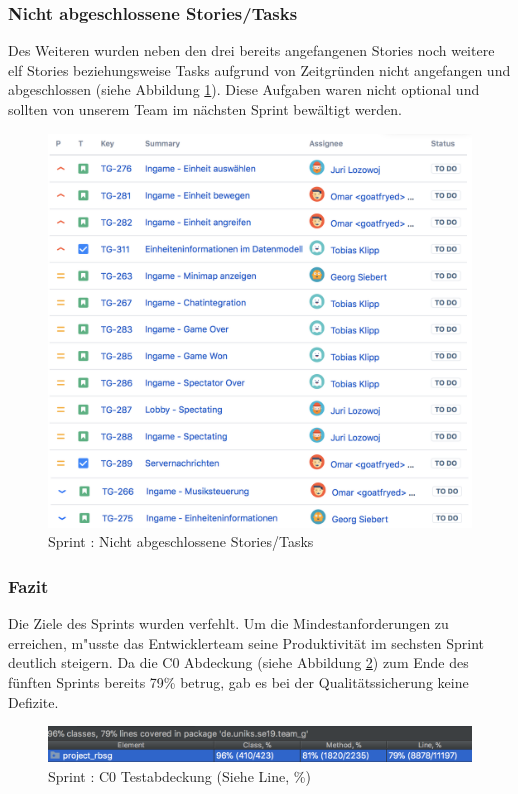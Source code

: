 \documentclass[12pt, titlepage]{scrartcl}
\newcommand{\RN}[1]{%
	\textup{\uppercase\expandafter{\romannumeral#1}}%
}
\begin{document}
        	\subsubsection{Nicht abgeschlossene Stories/Tasks}
        		Des Weiteren wurden neben den drei bereits angefangenen Stories noch weitere elf Stories beziehungsweise Tasks aufgrund von Zeitgr\"unden nicht angefangen und abgeschlossen (siehe Abbildung \ref{To_Do_5}). Diese Aufgaben waren nicht optional und sollten von unserem Team im n\"achsten Sprint bew\"altigt werden.
        		\begin{figure}[H] 
        			\centering
        			\includegraphics[width=\textwidth]{images/sprintV/openIssues.png}
        			\caption{Sprint \RN{5}: Nicht abgeschlossene Stories/Tasks}
        			\label{To_Do_5}
        		\end{figure}
        	\subsubsection{Fazit}
        		Die Ziele des Sprints wurden verfehlt. Um die Mindestanforderungen zu erreichen, m"usste das Entwicklerteam seine Produktivit\"at im sechsten Sprint deutlich steigern. Da die C0 Abdeckung (siehe Abbildung \ref{Coverage_5}) zum Ende des f\"unften Sprints bereits 79\% betrug, gab es bei der Qualit\"atssicherung keine Defizite.
        		\begin{figure}[H] 
        			\centering
        			\includegraphics[width=\textwidth]{images/sprintV/coverage.png}
        			\caption{Sprint \RN{5}: C0 Testabdeckung (Siehe Line, \%)}
        			\label{Coverage_5}
        		\end{figure} 
    \newpage
\end{document}
